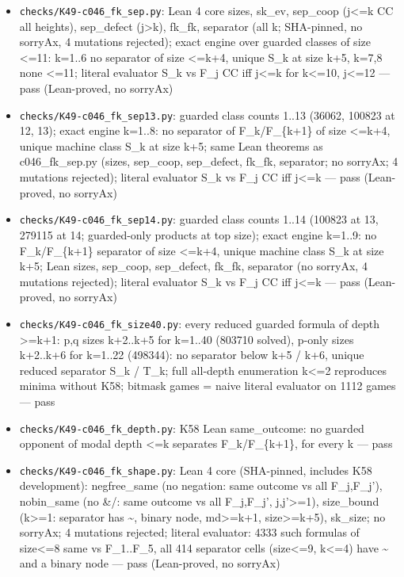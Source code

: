 \documentclass{article}
\begin{document}
\begin{itemize}
\item \texttt{checks/K49-c046\_fk\_sep.py}: Lean 4 core sizes, sk\_ev, sep\_coop (j\textless{}=k CC all heights), sep\_defect (j\textgreater{}k), fk\_fk, separator (all k; SHA-pinned, no sorryAx, 4 mutations rejected); exact engine over guarded classes of size \textless{}=11: k=1..6 no separator of size \textless{}=k+4, unique S\_k at size k+5, k=7,8 none \textless{}=11; literal evaluator S\_k vs F\_j CC iff j\textless{}=k for k\textless{}=10, j\textless{}=12 --- pass (Lean-proved, no sorryAx)
\item \texttt{checks/K49-c046\_fk\_sep13.py}: guarded class counts 1..13 (36062, 100823 at 12, 13); exact engine k=1..8: no separator of F\_k/F\_\{k+1\} of size \textless{}=k+4, unique machine class S\_k at size k+5; same Lean theorems as c046\_fk\_sep.py (sizes, sep\_coop, sep\_defect, fk\_fk, separator; no sorryAx; 4 mutations rejected); literal evaluator S\_k vs F\_j CC iff j\textless{}=k --- pass (Lean-proved, no sorryAx)
\item \texttt{checks/K49-c046\_fk\_sep14.py}: guarded class counts 1..14 (100823 at 13, 279115 at 14; guarded-only products at top size); exact engine k=1..9: no F\_k/F\_\{k+1\} separator of size \textless{}=k+4, unique machine class S\_k at size k+5; Lean sizes, sep\_coop, sep\_defect, fk\_fk, separator (no sorryAx, 4 mutations rejected); literal evaluator S\_k vs F\_j CC iff j\textless{}=k --- pass (Lean-proved, no sorryAx)
\item \texttt{checks/K49-c046\_fk\_size40.py}: every reduced guarded formula of depth \textgreater{}=k+1: p,q sizes k+2..k+5 for k=1..40 (803710 solved), p-only sizes k+2..k+6 for k=1..22 (498344): no separator below k+5 / k+6, unique reduced separator S\_k / T\_k; full all-depth enumeration k\textless{}=2 reproduces minima without K58; bitmask games = naive literal evaluator on 1112 games --- pass
\item \texttt{checks/K49-c046\_fk\_depth.py}: K58 Lean same\_outcome: no guarded opponent of modal depth \textless{}=k separates F\_k/F\_\{k+1\}, for every k --- pass
\item \texttt{checks/K49-c046\_fk\_shape.py}: Lean 4 core (SHA-pinned, includes K58 development): negfree\_same (no negation: same outcome vs all F\_j,F\_j'), nobin\_same (no \&/\textbar{}: same outcome vs all F\_j,F\_j', j,j'\textgreater{}=1), size\_bound (k\textgreater{}=1: separator has \textasciitilde{}, binary node, md\textgreater{}=k+1, size\textgreater{}=k+5), sk\_size; no sorryAx; 4 mutations rejected; literal evaluator: 4333 such formulas of size\textless{}=8 same vs F\_1..F\_5, all 414 separator cells (size\textless{}=9, k\textless{}=4) have \textasciitilde{} and a binary node --- pass (Lean-proved, no sorryAx)

\end{itemize}
\end{document}
